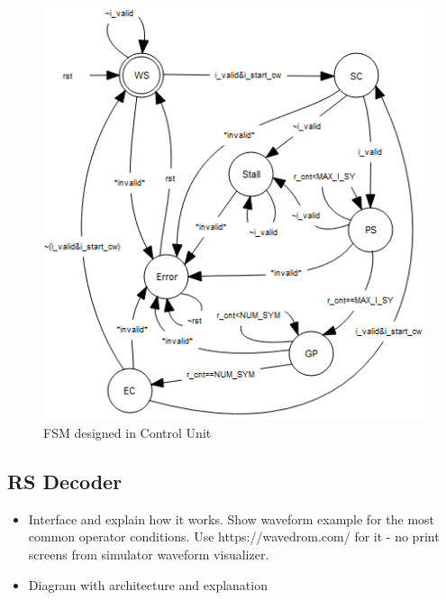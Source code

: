\documentclass[conference]{IEEEtran}
\begin{document}

\begin{figure}[!hbt]
  \includegraphics[width=\linewidth]{figures/fig10.png}
  \caption{FSM designed in Control Unit}
  \label{fig:fig7}
\end{figure}  

\subsection{RS Decoder}
\begin{itemize}
	\item Interface and explain how it works. Show waveform example for the most common operator conditions. Use https://wavedrom.com/ for it - no print screens from simulator waveform visualizer.
	\item Diagram with architecture and explanation
\end{itemize}
\end{document}
